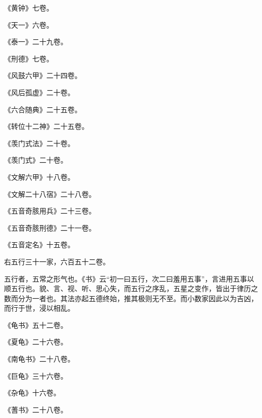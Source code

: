 \documentclass[12pt,UTF8]{ctexbook}
\begin{document}
《黄钟》七卷。



《天一》六卷。



《泰一》二十九卷。



《刑德》七卷。



《风鼓六甲》二十四卷。



《风后孤虚》二十卷。



《六合随典》二十五卷。



《转位十二神》二十五卷。



《羡门式法》二十卷。



《羡门式》二十卷。



《文解六甲》十八卷。



《文解二十八宿》二十八卷。



《五音奇胲用兵》二十三卷。



《五音奇胲刑德》二十一卷。



《五音定名》十五卷。



右五行三十一家，六百五十二卷。



五行者，五常之形气也。《书》云“初一曰五行，次二曰羞用五事”，言进用五事以顺五行也。貌、言、视、听、思心失，而五行之序乱，五星之变作，皆出于律历之数而分为一者也。其法亦起五德终始，推其极则无不至。而小数家因此以为吉凶，而行于世，浸以相乱。



《龟书》五十二卷。



《夏龟》二十六卷。



《南龟书》二十八卷。



《巨龟》三十六卷。



《杂龟》十六卷。



《蓍书》二十八卷。
\end{document}
